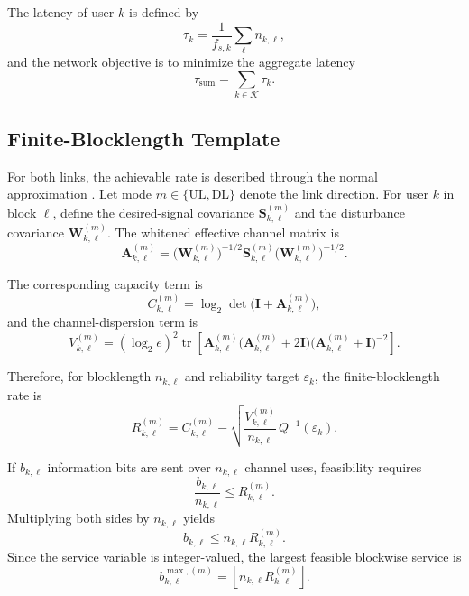 \documentclass[11pt]{article}
\newcommand{\Kset}{\mathcal{K}}
\newcommand{\I}{\mathbf{I}}
\newcommand{\A}{\mathbf{A}}
\newcommand{\Smat}{\mathbf{S}}
\newcommand{\Wmat}{\mathbf{W}}
\newcommand{\tr}{\operatorname{tr}}
\newcommand{\floor}[1]{\left\lfloor #1 \right\rfloor}
\newcommand{\UL}{\mathrm{UL}}
\newcommand{\DL}{\mathrm{DL}}
\begin{document}
The latency of user $k$ is defined by
\begin{equation}
\tau_k
=
\frac{1}{f_{s,k}}
\sum_{\ell} n_{k,\ell},
\label{eq:latency-user}
\end{equation}
and the network objective is to minimize the aggregate latency
\begin{equation}
\tau_{\mathrm{sum}}
=
\sum_{k\in\Kset}\tau_k.
\label{eq:latency-sum}
\end{equation}

\subsection{Finite-Blocklength Template}

For both links, the achievable rate is described through the normal
approximation \cite{polyanskiy2010}. Let mode $m \in \{\UL,\DL\}$ denote the
link direction. For user $k$ in block $\ell$, define the desired-signal
covariance $\Smat_{k,\ell}^{(m)}$ and the disturbance covariance
$\Wmat_{k,\ell}^{(m)}$. The whitened effective channel matrix is
\begin{equation}
\A_{k,\ell}^{(m)}
=
\bigl(\Wmat_{k,\ell}^{(m)}\bigr)^{-1/2}
\Smat_{k,\ell}^{(m)}
\bigl(\Wmat_{k,\ell}^{(m)}\bigr)^{-1/2}.
\label{eq:common-A}
\end{equation}

The corresponding capacity term is
\begin{equation}
C_{k,\ell}^{(m)}
=
\log_2\det\!\bigl(\I+\A_{k,\ell}^{(m)}\bigr),
\label{eq:common-C}
\end{equation}
and the channel-dispersion term is
\begin{equation}
V_{k,\ell}^{(m)}
=
(\log_2 e)^2
\tr\!\left[
\A_{k,\ell}^{(m)}
\bigl(\A_{k,\ell}^{(m)}+2\I\bigr)
\bigl(\A_{k,\ell}^{(m)}+\I\bigr)^{-2}
\right].
\label{eq:common-V}
\end{equation}

Therefore, for blocklength $n_{k,\ell}$ and reliability target
$\varepsilon_k$, the finite-blocklength rate is
\begin{equation}
R_{k,\ell}^{(m)}
=
C_{k,\ell}^{(m)}
-
\sqrt{\frac{V_{k,\ell}^{(m)}}{n_{k,\ell}}}\,
Q^{-1}(\varepsilon_k).
\label{eq:common-rate}
\end{equation}

If $b_{k,\ell}$ information bits are sent over $n_{k,\ell}$ channel uses,
feasibility requires
\begin{equation}
\frac{b_{k,\ell}}{n_{k,\ell}}
\le
R_{k,\ell}^{(m)}.
\label{eq:common-feasibility-rate}
\end{equation}
Multiplying both sides by $n_{k,\ell}$ yields
\begin{equation}
b_{k,\ell}
\le
n_{k,\ell}R_{k,\ell}^{(m)}.
\label{eq:common-feasibility-bits}
\end{equation}
Since the service variable is integer-valued, the largest feasible blockwise
service is
\begin{equation}
b_{k,\ell}^{\max,(m)}
=
\floor{n_{k,\ell}R_{k,\ell}^{(m)}}.
\label{eq:common-bmax}
\end{equation}
\end{document}
